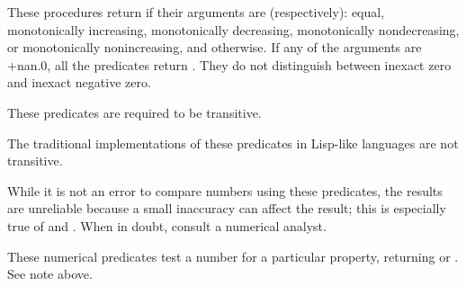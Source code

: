 \begin{entry}{%
}

These procedures return \schtrue{} if their arguments are (respectively):
equal, monotonically increasing, monotonically decreasing,
monotonically nondecreasing, or monotonically nonincreasing,
and \schfalse{} otherwise.
If any of the arguments are {\cf +nan.0}, all the predicates return \schfalse{}.
They do not distinguish between inexact zero and inexact negative zero.

These predicates are required to be transitive.

\begin{note}
The traditional implementations of these predicates in Lisp-like
languages are not transitive.
\end{note}

\begin{note}
While it is not an error to compare  numbers using these
predicates, the results are unreliable because a small inaccuracy
can affect the result; this is especially true of \ide{=} and .
When in doubt, consult a numerical analyst.
\end{note}

\end{entry}

\begin{entry}{%
}

These numerical predicates test a number for a particular property,
returning \schtrue{} or \schfalse.  See note above.

\end{entry}

